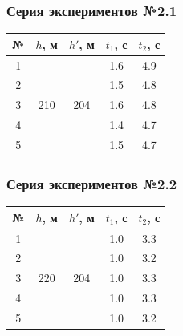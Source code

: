 \documentclass[12pt,a4paper]{article}
\begin{document}
\subsubsection*{Серия экспериментов №2.1}
\begin{tabular}{|c|c|c|c|c|}
    \hline
    № & \multicolumn{1}{l|}{$h$, м} & \multicolumn{1}{l|}{$h'$, м} & $t_1$, с & $t_2$, с \\
    \hline
    1 & \multirow{5}{*}{210}        & \multirow{5}{*}{204}         & 1.6      & 4.9      \\
    \cline{1-1} \cline{4-5} 
    2 &                             &                              & 1.5      & 4.8      \\
    \cline{1-1} \cline{4-5} 
    3 &                             &                              & 1.6      & 4.8      \\
    \cline{1-1} \cline{4-5} 
    4 &                             &                              & 1.4      & 4.7      \\
    \cline{1-1} \cline{4-5} 
    5 &                             &                              & 1.5      & 4.7      \\
    \hline
\end{tabular}
\subsubsection*{Серия экспериментов №2.2}
\begin{tabular}{|c|c|c|c|c|}
    \hline
    № & $h$, м               & $h'$, м              & $t_1$, с & $t_2$, с \\
    \hline
    1 & \multirow{5}{*}{220} & \multirow{5}{*}{204} & 1.0      & 3.3      \\
    \cline{1-1} \cline{4-5} 
    2 &                      &                      & 1.0      & 3.2      \\
    \cline{1-1} \cline{4-5} 
    3 &                      &                      & 1.0      & 3.3      \\
    \cline{1-1} \cline{4-5} 
    4 &                      &                      & 1.0      & 3.3      \\
    \cline{1-1} \cline{4-5} 
    5 &                      &                      & 1.0      & 3.2      \\
    \hline
\end{tabular}
\end{document}
